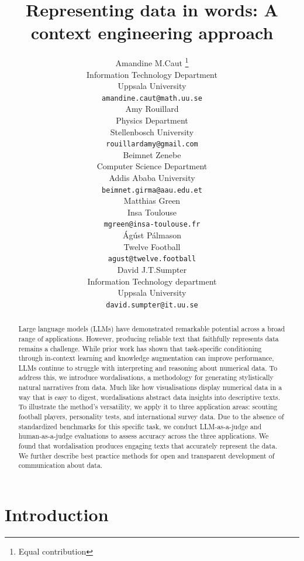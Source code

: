 \documentclass{article}
\title{Representing data in words: A context engineering approach}
\author{Amandine M.Caut \thanks{Equal contribution}\\
  Information Technology Department\\ 
  Uppsala University \\
  \texttt{amandine.caut@math.uu.se} \\\And
  Amy Rouillard \footnotemark[1]\\
  Physics Department \\
  Stellenbosch University \\
  \texttt{rouillardamy@gmail.com} \\\And
  Beimnet Zenebe \footnotemark[1]\\
  Computer Science Department \\
  Addis Ababa University \\
  \texttt{beimnet.girma@aau.edu.et} \\
  \AND
  Matthias Green \\
  Insa Toulouse \\
  \texttt{mgreen@insa-toulouse.fr} \\\And
  Ágúst Pálmason \\
  Twelve Football \\
  \texttt{agust@twelve.football} \\\And
  David J.T.Sumpter \\
  Information Technology department\\
  Uppsala University \\
  \texttt{david.sumpter@it.uu.se}
  }
\begin{document}
\maketitle


\begin{abstract}
Large language models (LLMs) have demonstrated remarkable potential across a broad range of applications. However, producing reliable text that faithfully represents data remains a challenge. While prior work has shown that task-specific conditioning through in-context learning and knowledge augmentation can improve performance, LLMs continue to struggle with interpreting and reasoning about numerical data. To address this, we introduce wordalisations, a methodology for generating stylistically natural narratives from data. Much like how visualisations display numerical data in a way that is easy to digest, wordalisations abstract data insights into descriptive texts. To illustrate the method's versatility, we apply it to three application areas: scouting football players, personality tests, and international survey data. Due to the absence of standardized benchmarks for this specific task, we conduct LLM-as-a-judge and human-as-a-judge evaluations to assess accuracy across the three applications. We found that wordalisation produces engaging texts that accurately represent the data. We further describe best practice methods for open and transparent development of communication about data. 
\end{abstract}



\section{Introduction}\label{sec1}
\end{document}
